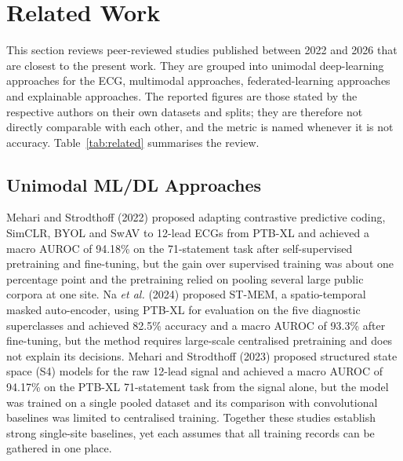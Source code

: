 \section{Related Work}
\label{sec:related}

This section reviews peer-reviewed studies published between 2022 and 2026 that are closest to
the present work. They are grouped into unimodal deep-learning approaches for the ECG, multimodal
approaches, federated-learning approaches and explainable approaches. The reported figures are
those stated by the respective authors on their own datasets and splits; they are therefore not
directly comparable with each other, and the metric is named whenever it is not accuracy.
Table~\ref{tab:related} summarises the review.

\subsection{Unimodal ML/DL Approaches}
Mehari and Strodthoff (2022) \cite{mehari2022ssl} proposed adapting contrastive predictive coding,
SimCLR, BYOL and SwAV to 12-lead ECGs from PTB-XL and achieved a macro AUROC of 94.18\% on the
71-statement task after self-supervised pretraining and fine-tuning, but the gain over supervised
training was about one percentage point and the pretraining relied on pooling several large public
corpora at one site. Na \textit{et al.} (2024) \cite{na2024stmem} proposed ST-MEM, a
spatio-temporal masked auto-encoder, using PTB-XL for evaluation on the five diagnostic
superclasses and achieved 82.5\% accuracy and a macro AUROC of 93.3\% after fine-tuning, but the
method requires large-scale centralised pretraining and does not explain its decisions. Mehari and
Strodthoff (2023) \cite{mehari2023s4} proposed structured state space (S4) models for the raw
12-lead signal and achieved a macro AUROC of 94.17\% on the PTB-XL 71-statement task from the
signal alone, but the model was trained on a single pooled dataset and its comparison with
convolutional baselines was limited to centralised training. Together these studies establish
strong single-site baselines, yet each assumes that all training records can be gathered in one
place.

